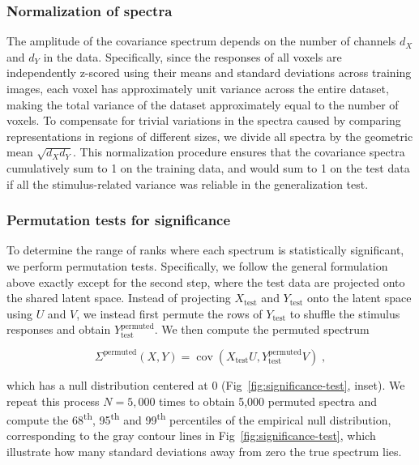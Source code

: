 \documentclass[10pt]{article}
\begin{document}
\subsubsection{Normalization of spectra}\label{normalization-of-spectra}

The amplitude of the covariance spectrum depends on the number of channels \(d_X\) and \(d_Y\) in the data. Specifically, since the responses of all voxels are independently z-scored using their means and standard deviations across training images, each voxel has approximately unit variance across the entire dataset, making the total variance of the dataset approximately equal to the number of voxels. To compensate for trivial variations in the spectra caused by comparing representations in regions of different sizes, we divide all spectra by the geometric mean \(\sqrt{d_X d_Y}\). This normalization procedure ensures that the covariance spectra cumulatively sum to 1 on the training data, and would sum to 1 on the test data if all the stimulus-related variance was reliable in the generalization test.

\subsubsection{Permutation tests for significance}\label{permutation-tests-for-significance}

To determine the range of ranks where each spectrum is statistically significant, we perform permutation tests. Specifically, we follow the general formulation above exactly except for the second step, where the test data are projected onto the shared latent space. Instead of projecting \(X_\text{test}\) and \(Y_\text{test}\) onto the latent space using \(U\) and \(V\), we instead first permute the rows of \(Y_\text{test}\) to shuffle the stimulus responses and obtain \(Y_\text{test}^\text{permuted}\). We then compute the permuted spectrum

\[
\Sigma^\text{permuted}(X, Y) = \operatorname{cov}
\left(X_\text{test} U, Y_\text{test}^\text{permuted} V \right)\;,
\]

which has a null distribution centered at 0 (Fig~\ref{fig:significance-test}, inset). We repeat this process \(N = 5,000\) times to obtain 5,000 permuted spectra and compute the 68\textsuperscript{th}, 95\textsuperscript{th} and 99\textsuperscript{th} percentiles of the empirical null distribution, corresponding to the gray contour lines in Fig~\ref{fig:significance-test}, which illustrate how many standard deviations away from zero the true spectrum lies.
\end{document}

